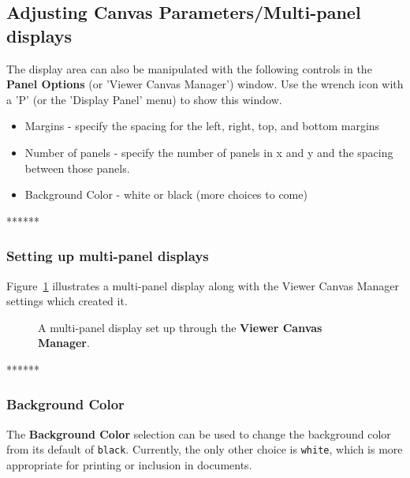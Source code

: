 \subsection{Adjusting Canvas Parameters/Multi-panel displays}
\label{section:display.viewerGUI.canvas}

The display area can also be manipulated with the following controls in
the {\bf Panel Options} (or 'Viewer Canvas Manager') window.
Use the wrench icon with a 'P' (or the 'Display Panel' menu) to show this
window.
\begin{itemize}
   \item Margins - specify the spacing for the left, right, top, and bottom margins
   \item Number of panels - specify the number of panels in x and y
         and the spacing between those panels.
   \item Background Color - white or black (more choices to come)
\end{itemize}

******
\subsubsection{Setting up multi-panel displays}
\label{section:display.viewerGUI.canvas.multi}

Figure~\ref{fig:viewer_canvas} illustrates a multi-panel display along
with the Viewer Canvas Manager settings which created it. 

\begin{figure}[h!]
\begin{center}
\caption{\label{fig:viewer_canvas} A multi-panel display
set up through the {\bf Viewer Canvas Manager}.} 
\hrulefill
\end{center}
\end{figure}

******
\subsubsection{Background Color}
\label{section:display.viewerGUI.canvas.background}

The {\bf Background Color} selection can be used to change the
background color from its default of {\tt black}.  Currently,
the only other choice is {\tt white}, which is more appropriate
for printing or inclusion in documents.

